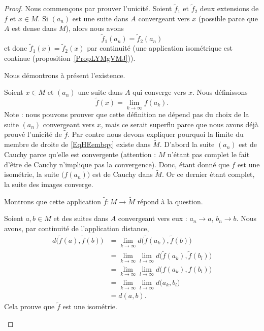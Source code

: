\begin{proof}
	Nous commençons par prouver l'unicité. Soient \( \tilde f_1\) et \( \tilde f_2\) deux extensions de \( f\) et \( x\in M\). Si \( (a_n)\) est une suite dans \( A\) convergeant vers \( x\) (possible parce que \( A\) est dense dans \( M\)), alors nous avons
	\begin{equation}
		\tilde f_1(a_n)=\tilde f_2(a_n)
	\end{equation}
	et donc \( \tilde f_1(x)=\tilde f_2(x)\) par continuité (une application isométrique est continue (proposition~\ref{PropLYMgVMJ})).

	Nous démontrons à présent l'existence.

	\begin{subproof}
		Soient \( x\in M\) et \( (a_n)\) une suite dans \( A\) qui converge vers \( x\). Nous définissons
		\begin{equation}    \label{EqHEembqy}
			\tilde f(x)=\lim_{k\to \infty} f(a_k).
		\end{equation}
		Note : nous pouvons prouver que cette définition ne dépend pas du choix de la suite \( (a_n)\) convergeant vers \( x\), mais ce serait superflu parce que nous avons déjà prouvé l'unicité de \( \tilde f\). Par contre nous devons expliquer pourquoi la limite du membre de droite de \eqref{EqHEembqy} existe dans \( \tilde M\). D'abord la suite \( (a_n)\) est de Cauchy parce qu'elle est convergente (attention : \( M\) n'étant pas complet le fait d'être de Cauchy n'implique pas la convergence). Donc, étant donné que \( f\) est une isométrie, la suite \( \big( f(a_n) \big)\) est de Cauchy dans \( \tilde M\). Or ce dernier étant complet, la suite des images converge.

		Montrons que cette application \( \tilde f\colon M\to \tilde M\) répond à la question.


		Soient \( a,b\in M\) et des suites dans \( A\) convergeant vers eux : \( a_n\to a\), \( b_n\to b\). Nous avons, par continuité de l'application distance,
		\begin{subequations}
			\begin{align}
				d\big( \tilde f(a),\tilde f(b) \big) & =\lim_{k\to \infty} d\big( \tilde f(a_k),\tilde f(b) \big)                      \\
				                                     & =\lim_{k\to \infty}\lim_{l\to \infty}  d\big( \tilde f(a_k),\tilde f(b_l) \big) \\
				                                     & =\lim_{k\to \infty}\lim_{l\to \infty}  d\big(  f(a_k), f(b_l) \big)             \\
				                                     & =\lim_{k\to \infty}\lim_{l\to \infty}  d\big( a_k,b_l\big)                      \\
				                                     & =d(a,b).
			\end{align}
		\end{subequations}
		Cela prouve que \( \tilde f\) est une isométrie.


\end{subproof}
\end{proof}
